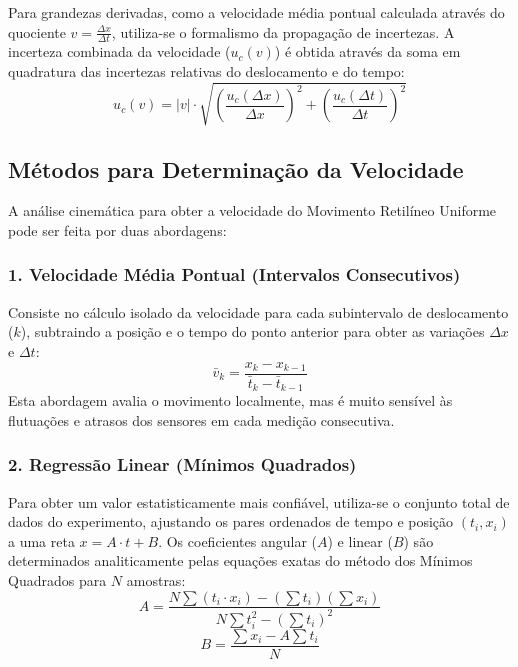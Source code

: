 \documentclass[12pt, a4paper]{article}
\begin{document}
Para grandezas derivadas, como a velocidade média pontual calculada através do quociente $v = \frac{\Delta x}{\Delta t}$, utiliza-se o formalismo da propagação de incertezas. A incerteza combinada da velocidade ($u_c(v)$) é obtida através da soma em quadratura das incertezas relativas do deslocamento e do tempo:
\begin{equation}
    u_c(v) = |v| \cdot \sqrt{\left(\frac{u_c(\Delta x)}{\Delta x}\right)^2 + \left(\frac{u_c(\Delta t)}{\Delta t}\right)^2}
\end{equation}

\subsection{Métodos para Determinação da Velocidade}
A análise cinemática para obter a velocidade do Movimento Retilíneo Uniforme pode ser feita por duas abordagens:

\subsubsection*{1. Velocidade Média Pontual (Intervalos Consecutivos)}
Consiste no cálculo isolado da velocidade para cada subintervalo de deslocamento ($k$), subtraindo a posição e o tempo do ponto anterior para obter as variações $\Delta x$ e $\Delta t$:
\begin{equation}
    \bar{v}_k = \frac{x_k - x_{k-1}}{\bar{t}_k - \bar{t}_{k-1}}
\end{equation}
Esta abordagem avalia o movimento localmente, mas é muito sensível às flutuações e atrasos dos sensores em cada medição consecutiva.

\subsubsection*{2. Regressão Linear (Mínimos Quadrados)}
Para obter um valor estatisticamente mais confiável, utiliza-se o conjunto total de dados do experimento, ajustando os pares ordenados de tempo e posição $(t_i, x_i)$ a uma reta $x = A \cdot t + B$. Os coeficientes angular ($A$) e linear ($B$) são determinados analiticamente pelas equações exatas do método dos Mínimos Quadrados para $N$ amostras:
\begin{equation}
    A = \frac{N \sum (t_i \cdot x_i) - \left(\sum t_i\right) \left(\sum x_i\right)}{N \sum t_i^2 - \left(\sum t_i\right)^2}
\end{equation}
\begin{equation}
    B = \frac{\sum x_i - A \sum t_i}{N}
\end{equation}
\end{document}
